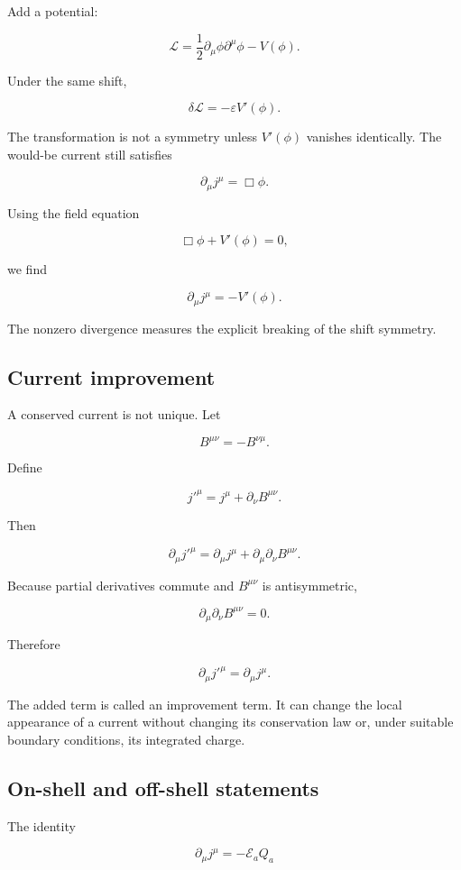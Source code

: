 Add a potential:

\[
\mathcal{L}
=
\frac{1}{2}
\partial_{\mu}\phi
\partial^{\mu}\phi
-
V(\phi).
\]

Under the same shift,

\[
\delta\mathcal{L}
=
-\varepsilon V'(\phi).
\]

The transformation is not a symmetry unless \(V'(\phi)\) vanishes identically. The would-be current still satisfies

\[
\partial_{\mu}j^{\mu}
=
\Box\phi.
\]

Using the field equation

\[
\Box\phi+V'(\phi)=0,
\]

we find

\[
\boxed{
\partial_{\mu}j^{\mu}
=
-V'(\phi)
}.
\]

The nonzero divergence measures the explicit breaking of the shift symmetry.

\subsection{Current improvement}

A conserved current is not unique. Let

\[
B^{\mu\nu}
=
-B^{\nu\mu}.
\]

Define

\[
j'^{\mu}
=
j^{\mu}
+
\partial_{\nu}B^{\mu\nu}.
\]

Then

\[
\partial_{\mu}j'^{\mu}
=
\partial_{\mu}j^{\mu}
+
\partial_{\mu}\partial_{\nu}B^{\mu\nu}.
\]

Because partial derivatives commute and \(B^{\mu\nu}\) is antisymmetric,

\[
\partial_{\mu}\partial_{\nu}B^{\mu\nu}=0.
\]

Therefore

\[
\partial_{\mu}j'^{\mu}
=
\partial_{\mu}j^{\mu}.
\]

The added term is called an improvement term. It can change the local appearance of a current without changing its conservation law or, under suitable boundary conditions, its integrated charge.

\subsection{On-shell and off-shell statements}

The identity

\[
\partial_{\mu}j^{\mu}
=
-\mathcal{E}_aQ_a
\]

